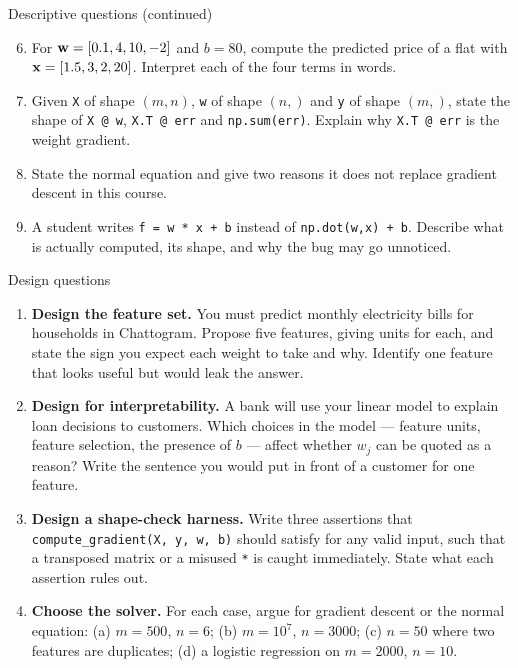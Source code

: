 \documentclass[aspectratio=169,10pt]{beamer}
\begin{document}
\begin{frame}{Descriptive questions (continued)}
  \footnotesize
  \begin{enumerate}\setcounter{enumi}{5}
    \item For $\mathbf{w}=[0.1,4,10,-2]$ and $b=80$, compute the predicted price of a flat with
          $\mathbf{x}=[1.5,3,2,20]$. Interpret each of the four terms in words. \hfill{}
    \item Given \texttt{X} of shape $(m,n)$, \texttt{w} of shape $(n,)$ and \texttt{y} of
          shape $(m,)$, state the shape of \texttt{X @ w}, \texttt{X.T @ err} and
          \texttt{np.sum(err)}. Explain why \texttt{X.T @ err} is the weight gradient.
          \hfill{}
    \item State the normal equation and give two reasons it does not replace gradient
          descent in this course. \hfill{}
    \item A student writes \texttt{f = w * x + b} instead of \texttt{np.dot(w,x) + b}.
          Describe what is actually computed, its shape, and why the bug may go unnoticed.
          \hfill{}
  \end{enumerate}
\end{frame}

\begin{frame}{Design questions}
  \footnotesize
  \begin{enumerate}
    \item \textbf{Design the feature set.} You must predict monthly electricity bills for
          households in Chattogram. Propose five features, giving units for each, and state
          the sign you expect each weight to take and why. Identify one feature that looks
          useful but would leak the answer. \hfill{}
    \item \textbf{Design for interpretability.} A bank will use your linear model to explain
          loan decisions to customers. Which choices in the model --- feature units, feature
          selection, the presence of $b$ --- affect whether $w_j$ can be quoted as a reason?
          Write the sentence you would put in front of a customer for one feature.
          \hfill{}
    \item \textbf{Design a shape-check harness.} Write three assertions that
          \texttt{compute\_gradient(X, y, w, b)} should satisfy for any valid input, such
          that a transposed matrix or a misused \texttt{*} is caught immediately. State what
          each assertion rules out. \hfill{}
    \item \textbf{Choose the solver.} For each case, argue for gradient descent or the normal
          equation: (a) $m=500$, $n=6$; (b) $m=10^7$, $n=3000$; (c) $n=50$ where two features
          are duplicates; (d) a logistic regression on $m=2000$, $n=10$. \hfill{}
  \end{enumerate}
\end{frame}
\end{document}
